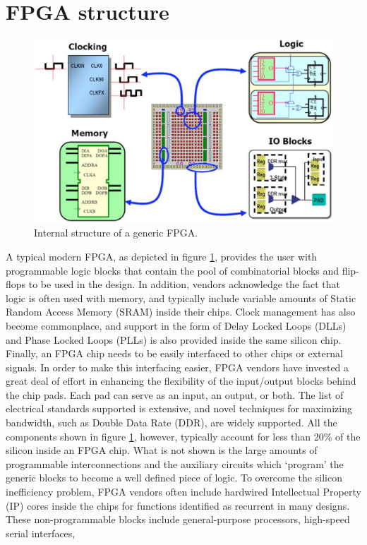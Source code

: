 \section{FPGA structure}
\begin{figure}[H]
	\centering
	\includegraphics[width=0.7\linewidth]{IMG/ch3/FPGA2}
	\caption{Internal structure of a generic FPGA.}
	\label{fig:fpga2}
\end{figure}
\noindent A typical modern FPGA, as depicted in figure \ref{fig:fpga2}, provides the user with programmable logic blocks that
contain the pool of combinatorial blocks and flip-flops to be used in the design. In addition, vendors
acknowledge the fact that logic is often used with memory, and typically include
variable amounts of Static Random Access Memory (SRAM) inside their chips. Clock management has
also become commonplace, and support in the form of Delay Locked Loops (DLLs) and Phase Locked
Loops (PLLs) is also provided inside the same silicon chip. Finally, an FPGA chip needs to be easily interfaced to other chips or
external signals. In order to make this interfacing easier, FPGA vendors have invested a great deal of
effort in enhancing the flexibility of the input/output blocks behind the chip pads. Each pad can serve
as an input, an output, or both. The list of electrical standards supported is extensive, and novel
techniques for maximizing bandwidth, such as Double Data Rate (DDR), are widely supported.
\newline
All the components shown in figure \ref{fig:fpga2}, however, typically account for less than 20\% of the silicon
inside an FPGA chip. What is not shown is the large amounts of programmable interconnections and the
auxiliary circuits which ‘program’ the generic blocks to become a well defined piece of logic.
To overcome the silicon inefficiency problem, FPGA vendors often include hardwired
Intellectual Property (IP) cores inside the chips for functions identified as recurrent in many designs.
These non-programmable blocks include general-purpose processors, high-speed serial interfaces,
